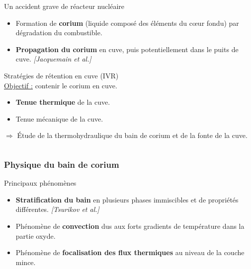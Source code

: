 \documentclass{beamer}
\begin{document}
\begin{frame}
\begin{columns}[c]
\begin{column}{0.6\textwidth}
\begin{ceablock}{Un accident grave de réacteur nucléaire}
\begin{itemize}
				\item Formation de \textbf{corium} (liquide composé des éléments du cœur fondu) par dégradation du combustible.
				\item \textbf{Propagation du corium} en cuve, puis potentiellement dans le puits de cuve. {\color{cea_texte!80}\tiny\textit{[Jacquemain et al.]}}
			\end{itemize}	
	    	\end{ceablock}
		\begin{ceablock}{Stratégies de rétention en cuve (IVR)}
		\hspace{-0.8cm}\\
		\underline{Objectif :} contenir le corium en cuve.
			\begin{itemize}
				\item \textbf{Tenue thermique} de la cuve.
				\item Tenue mécanique de la cuve.
			\end{itemize}	
	    	\end{ceablock}
		$\Rightarrow$ Étude de la thermohydraulique du bain de corium et de la fonte de la cuve.
        \end{column}
\normalsize
	\end{columns}
\end{frame}

\begin{frame}
    \frametitle{Physique du bain de corium}
    \scriptsize
    \begin{ceablock}{Principaux phénomènes}
        \begin{itemize}
		\item \textbf{Stratification du bain} en plusieurs phases immiscibles et de propriétés différentes. {\color{cea_texte!80}\tiny\textit{[Tsurikov et al.]}}
		\item Phénomène de \textbf{convection} dus aux forts gradients de température dans la partie oxyde.
		\item Phénomène de \textbf{focalisation des flux thermiques} au niveau de la couche mince.
	\end{itemize}
    \end{ceablock}
\begin{center}
		\begin{tikzpicture}[scale = 0.6, every node/.style={scale=0.6}]
        
		\end{tikzpicture}

\end{center}
\end{frame}
\end{document}
